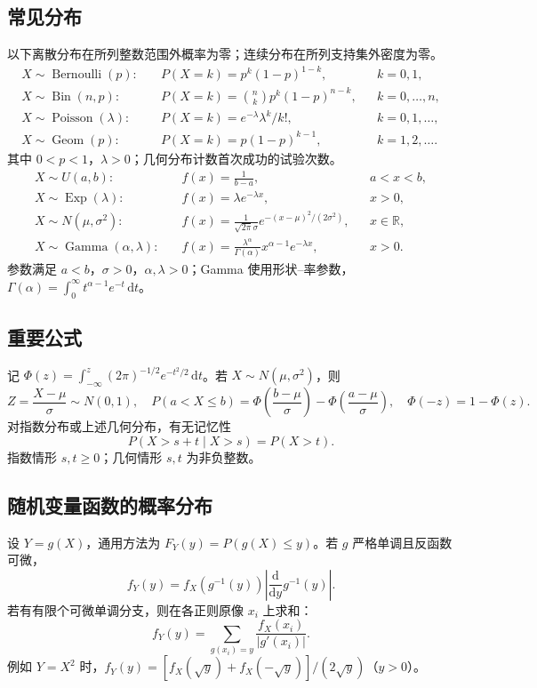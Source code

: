 \documentclass[../main.tex]{subfiles}
\begin{document}
\subsection{常见分布}
以下离散分布在所列整数范围外概率为零；连续分布在所列支持集外密度为零。
\begin{align*}
X\sim\operatorname{Bernoulli}(p):\quad&P(X=k)=p^k(1-p)^{1-k}, &&k=0,1,\\
X\sim\operatorname{Bin}(n,p):\quad&P(X=k)=\binom nkp^k(1-p)^{n-k}, &&k=0,\ldots,n,\\
X\sim\operatorname{Poisson}(\lambda):\quad&P(X=k)=e^{-\lambda}\lambda^k/k!, &&k=0,1,\ldots,\\
X\sim\operatorname{Geom}(p):\quad&P(X=k)=p(1-p)^{k-1}, &&k=1,2,\ldots.
\end{align*}
其中 $0<p<1$，$\lambda>0$；几何分布计数首次成功的试验次数。
\begin{align*}
X\sim U(a,b):\quad&f(x)=\frac1{b-a}, &&a<x<b,\\
X\sim\operatorname{Exp}(\lambda):\quad&f(x)=\lambda e^{-\lambda x}, &&x>0,\\
X\sim N(\mu,\sigma^2):\quad&f(x)=\frac1{\sqrt{2\pi}\sigma}
 e^{-(x-\mu)^2/(2\sigma^2)}, &&x\in\mathbb R,\\
X\sim\operatorname{Gamma}(\alpha,\lambda):\quad&f(x)=\frac{\lambda^\alpha}{\Gamma(\alpha)}x^{\alpha-1}e^{-\lambda x}, &&x>0.
\end{align*}
参数满足 $a<b$，$\sigma>0$，$\alpha,\lambda>0$；Gamma 使用形状--率参数，$\Gamma(\alpha)=\int_0^\infty t^{\alpha-1}e^{-t}\,\mathrm dt$。
\subsection{重要公式}
记 $\Phi(z)=\int_{-\infty}^z(2\pi)^{-1/2}e^{-t^2/2}\,\mathrm dt$。若 $X\sim N(\mu,\sigma^2)$，则
\[
Z=\frac{X-\mu}{\sigma}\sim N(0,1),\quad
P(a<X\le b)=\Phi\!\left(\frac{b-\mu}{\sigma}\right)-\Phi\!\left(\frac{a-\mu}{\sigma}\right),\quad
\Phi(-z)=1-\Phi(z).
\]
对指数分布或上述几何分布，有无记忆性
\[
P(X>s+t\mid X>s)=P(X>t).
\]
指数情形 $s,t\ge0$；几何情形 $s,t$ 为非负整数。
\subsection{随机变量函数的概率分布}
设 $Y=g(X)$，通用方法为 $F_Y(y)=P(g(X)\le y)$。若 $g$ 严格单调且反函数可微，
\[
f_Y(y)=f_X(g^{-1}(y))\left|\frac{\mathrm d}{\mathrm dy}g^{-1}(y)\right|.
\]
若有有限个可微单调分支，则在各正则原像 $x_i$ 上求和：
\[
f_Y(y)=\sum_{g(x_i)=y}\frac{f_X(x_i)}{|g'(x_i)|}.
\]
例如 $Y=X^2$ 时，$f_Y(y)=[f_X(\sqrt y)+f_X(-\sqrt y)]/(2\sqrt y)$（$y>0$）。
\end{document}
